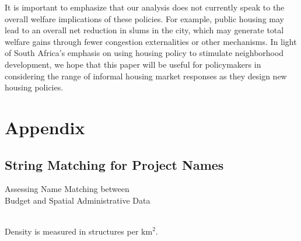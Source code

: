 \documentclass[12pt]{article}
\begin{document}
It is important to emphasize that our analysis does not currently speak to the overall welfare implications of these policies.  For example, public housing may lead to an overall net reduction in slums in the city, which may generate total welfare gains through fewer congestion externalities or other mechanisms.  In light of South Africa's emphasis on using housing policy to stimulate neighborhood development, we hope that this paper will be useful for policymakers in considering the range of informal housing market responses as they design new housing policies.








{}
\nocite{*}
\singlespacing
\setlength\bibsep{0pt}






\appendix
\doublespacing

\section{Appendix}

\subsection{String Matching for Project Names}

\begin{table}
	\centering
	\caption{Assessing Name Matching between \\Budget and Spatial Administrative Data}\label{table:stringmatch}
 \\
Density is measured in structures per $\text{km}^{2}$.

\end{table}
\end{document}
